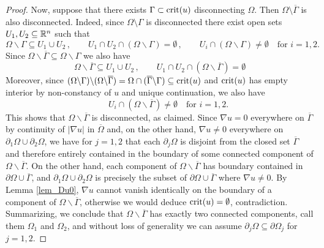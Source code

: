 \documentclass[10 pt,a4paper]{article}
\theoremstyle{definition}
\begin{document}
\begin{proof}
	Now, suppose that there exists $\Gamma \subset {\rm crit}(u)$ disconnecting $\Omega$. Then $\Omega\setminus\overline{\Gamma}$ is also disconnected. Indeed, since $\Omega\setminus\Gamma$ is disconnected there exist open sets $U_1,U_2\subseteq\mathbb R^n$ such that
	\[
		\Omega\backslash\Gamma \subseteq U_1\cup U_2 \, , \qquad U_1\cap U_2\cap(\Omega\backslash\Gamma) = \emptyset \, , \qquad U_i \cap (\Omega\backslash\Gamma) \neq \emptyset \quad \text{for } i = 1,2.
	\]
	Since $\Omega\backslash\overline{\Gamma} \subseteq \Omega\backslash\Gamma$ we also have
	\[
		\Omega\backslash\overline{\Gamma} \subseteq U_1\cup U_2 \, , \qquad U_1\cap U_2\cap(\Omega\backslash\overline{\Gamma}) = \emptyset
	\]
	Moreover, since $(\Omega\backslash\Gamma)\backslash(\Omega\backslash\overline{\Gamma}) = \Omega\cap(\overline{\Gamma}\backslash\Gamma) \subseteq {\rm crit}(u)$ and ${\rm crit}(u)$ has empty interior by non-constancy of $u$ and unique continuation, 
	we also have
	\[
		\qquad U_i \cap (\Omega\backslash\overline{\Gamma}) \neq \emptyset \quad \text{for } i = 1,2.
	\]
	This shows that $\Omega\backslash\overline{\Gamma}$ is disconnected, as claimed. Since $\nabla u=0$ everywhere on $\overline{\Gamma}$ by continuity of $|\nabla u|$ in $\overline{\Omega}$ and, on the other hand, $\nabla u\neq0$ everywhere on $\partial_1\Omega\cup\partial_2\Omega$, we have for $j=1,2$ that each $\partial_j\Omega$ is disjoint from the closed set $\overline{\Gamma}$ and therefore entirely contained in the boundary of some connected component of $\Omega\backslash\overline{\Gamma}$. On the other hand, each component of $\Omega\backslash\overline{\Gamma}$ has boundary contained in $\partial\Omega \cup \overline{\Gamma}$, and $\partial_1\Omega \cup \partial_2\Omega$ is precisely the subset of $\partial\Omega \cup \overline{\Gamma}$ where $\nabla u\neq 0$. By Lemma \ref{lem_Du0}, $\nabla u$ cannot vanish identically on the boundary of a component of $\Omega\backslash\overline{\Gamma}$, otherwise we would deduce ${\rm crit}(u)=\emptyset$, contradiction. Summarizing,  we conclude that $\Omega\backslash\overline{\Gamma}$ has exactly two connected components, call them $\Omega_1$ and $\Omega_2$, and without loss of generality we can assume $\partial_j\Omega\subseteq\partial\Omega_j$ for $j=1,2$.

\end{proof}
\end{document}
